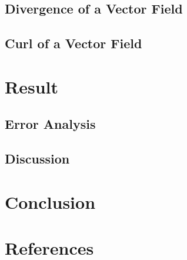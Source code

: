 \documentclass[12pt]{article}
\begin{document}
\subsection{Divergence of a Vector Field}



\subsection{Curl of a Vector Field}



\newpage
\section{Result}
\subsection{Error Analysis}



\subsection{Discussion}



\newpage
\section{Conclusion}



\newpage
\section{References}


\nocite{El-Deeb_PEU-218_Assignments}
\end{document}
